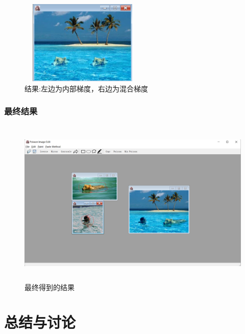 \documentclass{article}
\begin{document}
        \begin{figure}[H]
        	\begin{center}
        		
        		\includegraphics[width=6cm,height=4cm]{duibi2}
        		
        		\caption{结果:左边为内部梯度，右边为混合梯度} \label{duibi2.label}
        	\end{center}
        \end{figure}
        
            \subsubsection{最终结果}
            
          \begin{figure}[H]
        	\begin{center}
        		
        		\includegraphics[width=13cm,height=8cm]{zuizhong}
        		
        		\caption{最终得到的结果} \label{zuizhong.label}
        	\end{center}
        \end{figure}
		

	
	
	\section{总结与讨论}
	
\end{document}

